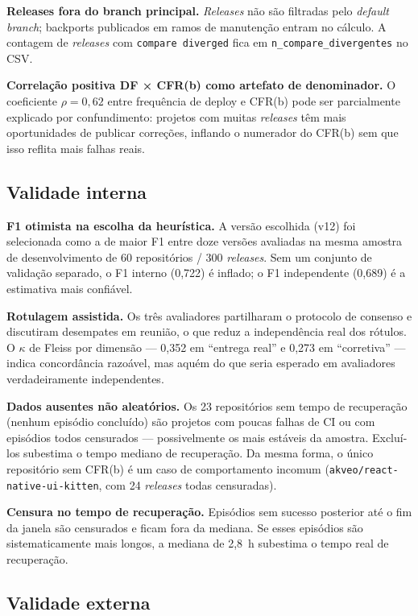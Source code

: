 \textbf{Releases fora do branch principal.} \textit{Releases} não são filtradas pelo
\textit{default branch}; backports publicados em ramos de manutenção entram no cálculo.
A contagem de \textit{releases} com \texttt{compare diverged} fica em
\texttt{n\_compare\_divergentes} no CSV.

\textbf{Correlação positiva DF × CFR(b) como artefato de denominador.} O coeficiente
$\rho = 0{,}62$ entre frequência de deploy e CFR(b) pode ser parcialmente explicado por
confundimento: projetos com muitas \textit{releases} têm mais oportunidades de publicar
correções, inflando o numerador do CFR(b) sem que isso reflita mais falhas reais.

\subsection{Validade interna}

\textbf{F1 otimista na escolha da heurística.} A versão escolhida (v12) foi selecionada
como a de maior F1 entre doze versões avaliadas na mesma amostra de desenvolvimento de
60 repositórios / 300 \textit{releases}. Sem um conjunto de validação separado, o F1
interno (0,722) é inflado; o F1 independente (0,689) é a estimativa mais confiável.

\textbf{Rotulagem assistida.} Os três avaliadores partilharam o protocolo de consenso e
discutiram desempates em reunião, o que reduz a independência real dos rótulos. O $\kappa$
de Fleiss por dimensão — 0,352 em ``entrega real'' e 0,273 em ``corretiva'' — indica
concordância razoável, mas aquém do que seria esperado em avaliadores verdadeiramente
independentes.

\textbf{Dados ausentes não aleatórios.} Os 23 repositórios sem tempo de recuperação
(nenhum episódio concluído) são projetos com poucas falhas de CI ou com episódios todos
censurados — possivelmente os mais estáveis da amostra. Excluí-los subestima o tempo
mediano de recuperação. Da mesma forma, o único repositório sem CFR(b) é um caso de
comportamento incomum (\texttt{akveo/react-native-ui-kitten}, com 24 \textit{releases} todas censuradas).

\textbf{Censura no tempo de recuperação.} Episódios sem sucesso posterior até o fim da janela
são censurados e ficam fora da mediana. Se esses episódios são sistematicamente mais longos, a
mediana de 2,8~h subestima o tempo real de recuperação.

\subsection{Validade externa}

